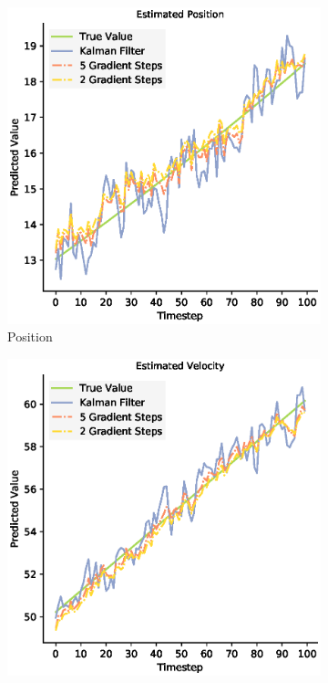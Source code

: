 \begin{figure}
 \begin{subfigure}{0.49\textwidth}
 \centering
 \includegraphics[width=.95\linewidth]{chapter_3_figures/Estimated_Position_NKF_zoomed.eps}
 \caption{Position}
 \end{subfigure}
 \begin{subfigure}{0.49\textwidth}
 \centering
 \includegraphics[width=.95\linewidth]{chapter_3_figures/Estimated_Velocity_NKF_zoomed.eps}

\end{subfigure}
\end{figure}
